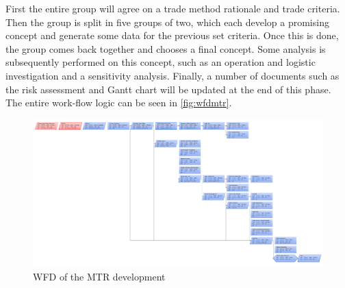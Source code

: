 \documentclass[a4paper]{report}
\begin{document}
First the entire group will agree on a trade method rationale and trade criteria. Then the group is split in five groups of two, which each develop a promising concept and generate some data for the previous set criteria. Once this is done, the group comes back together and chooses a final concept. Some analysis is subsequently performed on this concept, such as an operation and logistic investigation and a sensitivity analysis. Finally, a number of documents such as the risk assessment and Gantt chart will be updated at the end of this phase. The entire work-flow logic can be seen in \autoref{fig:wfdmtr}. 
\begin{figure}[h]
	\centering
	
	\includegraphics[width=\textwidth]{Figures/MIDWFD.pdf}
	\caption{WFD of the MTR development}
	\label{fig:wfdmtr}
	
\end{figure}
\end{document}
